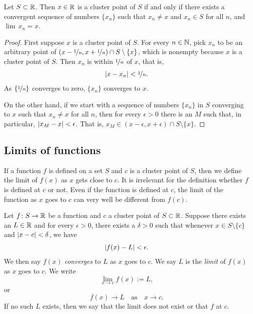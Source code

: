\begin{prop}
Let $S \subset {\mathbb{R}}$.  Then $x \in {\mathbb{R}}$ is a cluster point of $S$
if and only if
there exists a convergent sequence of numbers $\{ x_n \}$ such that
$x_n \not= x$ and $x_n \in S$ for all $n$, and $\lim\, x_n = x$.
\end{prop}

\begin{proof}
First suppose $x$ is a cluster point of $S$.
For every $n \in {\mathbb{N}}$, pick $x_n$ to be an arbitrary point of
$(x-\nicefrac{1}{n},x+\nicefrac{1}{n}) \cap S \setminus \{x\}$, which
is nonempty because $x$ is a cluster point of $S$.
Then
$x_n$ is within $\nicefrac{1}{n}$ of $x$, that is,
\begin{equation*}
\abs{x-x_n} < \nicefrac{1}{n} .
\avoidbreak
\end{equation*}
As $\{ \nicefrac{1}{n} \}$ converges to zero, $\{ x_n \}$ converges to $x$.

On the other hand, if we start with a sequence of numbers $\{ x_n \}$ in $S$
converging to $x$ such that $x_n \not= x$ for all $n$, then for every
$\epsilon > 0$ there is an $M$ such that, in particular, $\left\lvert {x_M - x} \right\rvert <
\epsilon$.  That is, $x_M \in (x-\epsilon,x+\epsilon) \cap S \setminus \{x\}$.
\end{proof}

\subsection{Limits of functions}

If a function $f$ is defined on a set $S$ and $c$ is a cluster point of $S$,
then we define the limit of $f(x)$ as $x$ gets close to $c$.  
It is irrelevant for the definition whether $f$ is defined at $c$ or not.
Even if the function is defined at $c$, the limit of the
function as $x$ goes to $c$ can very well be different
from $f(c)$.

\begin{defn}
%
Let $f \colon S \to {\mathbb{R}}$ be a function and $c$ a cluster point of
$S \subset {\mathbb{R}}$.
Suppose there exists an $L \in {\mathbb{R}}$ and for every $\epsilon > 0$,
there exists a $\delta > 0$ such that whenever $x \in S \setminus \{ c \}$
and $\left\lvert {x - c} \right\rvert < \delta$, we have
\begin{equation*}
\left\lvert {f(x) - L} \right\rvert < \epsilon .
\end{equation*}
We then say $f(x)$ \emph{converges} to $L$ as $x$ goes
to $c$.  We say $L$ is the \emph{limit} of $f(x)$ as $x$
goes to $c$.  We write
\begin{equation*}
\lim_{x \to c} f(x) := L ,
\end{equation*}
or 
\begin{equation*}
f(x) \to L \quad\text{as}\quad x \to c .
\end{equation*}
If no such $L$ exists, then we say that the limit does not exist or
that $f$ \emph{} at $c$.
\end{defn}

